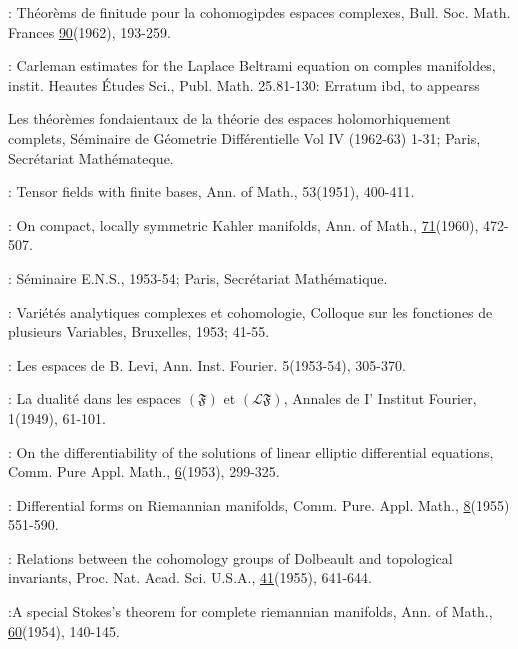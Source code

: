 \begin{thebibliography}{99}
:\pageoriginale
  Th\'eor\`ems  de finitude pour la cohomogipdes
  espaces complexes, Bull. Soc. Math. Frances \underline{90}(1962),
  193-259.

: Carleman estimates for
  the Laplace Beltrami equation on comples manifoldes,
  instit. Heautes \'Etudes Sci., Publ. Math. 25.81-130:
  Erratum ibd, to appearss

 Les
  th\'eor\`emes fondaientaux de la th\'eorie
  des espaces holomorhiquement complets, S\'eminaire de
  G\'eometrie Diff\'erentielle Vol IV (1962-63) 1-31;
  Paris, Secr\'etariat Math\'emateque.

: Tensor fields with finite bases, Ann. of
  Math., 53(1951), 400-411.

: On compact, locally
  symmetric Kahler manifolds, Ann. of Math., \underline{71}(1960),
  472-507.

: S\'eminaire E.N.S., 1953-54; Paris,
  Secr\'etariat Math\'ematique. 

: Vari\'et\'es analytiques
  complexes et cohomologie, Colloque sur les fonctiones de plusieurs
  Variables, Bruxelles, 1953; 41-55.

: Les espaces de B. Levi,
  Ann. Inst. Fourier. 5(1953-54), 305-370. 

: La
  dualit\'e dans les espaces $(\mathfrak{F})$ et $(\mathscr{L}\mathfrak{F})$,
  Annales de I' Institut Fourier, 1(1949), 61-101.

: On the differentiability of the
  solutions of linear elliptic differential equations, Comm. Pure
  Appl. Math., \underline{6}(1953), 299-325.

: Differential forms on Riemannian
  manifolds, Comm. Pure. Appl. Math., \underline{8}(1955) 551-590.

: Relations between the cohomology groups
  of Dolbeault and topological invariants,
  Proc. Nat. Acad. Sci. U.S.A., \underline{41}(1955), 641-644.

:\pageoriginale A special Stokes's theorem for complete
  riemannian manifolds, Ann. of Math., \underline{60}(1954), 140-145. 


\end{thebibliography}
